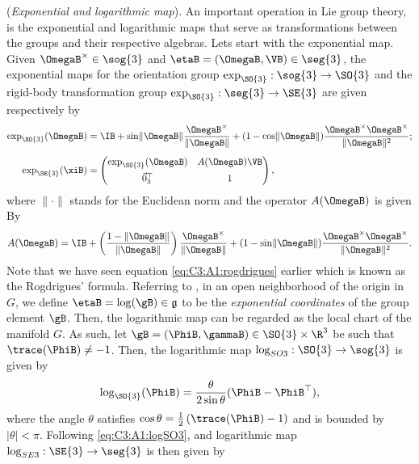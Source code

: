 (\textit{Exponential and logarithmic map}). An important operation in Lie group theory, is the exponential and logarithmic maps that serve as transformations between the groups and their respective algebras. Lets start with the exponential map. Given $\OmegaB^\times\in \sog{3}$ and $\etaB = (\OmegaB,\VB) \in \seg{3}$, the exponential maps for the orientation group $\exp_{\SO{3}}: \sog{3} \to \SO{3}$ and the rigid-body transformation group $\exp_{\SO{3}}: \seg{3} \to \SE{3}$ are given respectively by
%
\begin{align}
\exp_{\SO{3}}(\OmegaB) & = \IB + \sin \lVert \OmegaB \rVert\frac{\OmegaB^\times}{\lVert \OmegaB \rVert} + (1 - \cos \lVert \OmegaB \rVert) \frac{ \OmegaB^\times \OmegaB^\times }{\lVert \OmegaB \rVert^2}; \label{eq:C3:A1:rogdrigues} \\[0.45em]
\exp_{\SE{3}}(\xiB) & =
\begin{pmatrix}
\exp_{\SO{3}}(\OmegaB) & A(\OmegaB) \VB \\[0.45em]\vec{0}_3^\top & 1
\end{pmatrix},
\end{align}
%
where $\lVert \cdot \rVert$ stands for the Euclidean norm and the operator $A(\OmegaB)$ is given By
%
\begin{equation}
A(\OmegaB) = \IB + \left(\frac{1 - \lVert \OmegaB \rVert}{\lVert \OmegaB \rVert}\right) \frac{\OmegaB^\times}{\lVert \OmegaB \rVert} + (1 - \sin \lVert \OmegaB \rVert) \frac{ \OmegaB^\times \OmegaB^\times }{\lVert \OmegaB \rVert^2}.
\end{equation}
%
Note that we have seen equation \eqref{eq:C3:A1:rogdrigues} earlier which is known as the Rogdrigues' formula. Referring to \cite{Bullo1995}, in an open neighborhood of the origin in $G$, we define $\etaB = \log(\gB) \in \mathfrak{g}$ to be the \emph{exponential coordinates} of the group element $\gB$. 
Then, the logarithmic map can be regarded as the local chart of the manifold $G$. 
As such, let $\gB = (\PhiB, \gammaB) \in \SO{3} \times \R^3$ be such that $\trace(\PhiB) \neq -1$. Then, the logarithmic map $\log_{SO{3}}: \SO{3} \to \sog{3}$ is given by
%
\begin{equation}
  \log_{\SO{3}}(\PhiB) = \frac{\theta}{2\sin\theta}(\PhiB - \PhiB^\top), 
  \label{eq:C3:A1:logSO3} 
\end{equation}
%
where the angle $\theta$ satisfies $\cos \theta = \frac{1}{2} \left(\trace(\PhiB)- 1 \right)$ and is bounded by $|\theta| < \pi$. Following \eqref{eq:C3:A1:logSO3}, and logarithmic map $\log_{SE{3}}: \SE{3} \to \seg{3}$ is then given by
